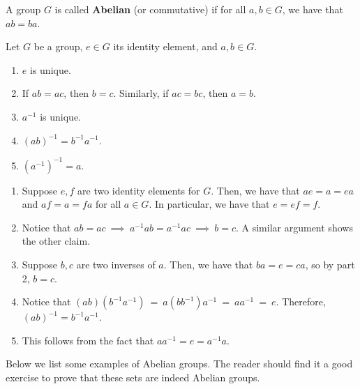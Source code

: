 \documentclass{article}
\begin{document}
\begin{defn}[]
A group $ G $ is called \textbf{Abelian} (or commutative) if for all $ a, b \in G $, we have that $ ab = ba $.
\end{defn}

\newpage
\begin{thm}[title=Basic Properties]
Let $ G $ be a group, $ e \in G $ its identity element, and $ a, b \in G $.
\begin{enumerate}[]
    \item $ e $ is unique.
    \item If $ ab = ac $, then $ b = c $. Similarly, if $ ac = bc $, then $ a = b $.
    \item $ a^{-1} $ is unique.
    \item $ (ab)^{-1} = b^{-1}a^{-1} $.
    \item $ (a^{-1})^{-1} = a $.
\end{enumerate}
\end{thm}

\begin{pf}[source=Primary Source Material]
    \begin{enumerate}[]
        \item Suppose $ e, f $ are two identity elements for $ G $. Then, we have that $ ae = a = ea $ and $ af = a = fa $ for all $ a \in G $. In particular, we have that $ e = ef = f $.
        \item Notice that $ ab = ac \ \implies \ a^{-1}ab = a^{-1}ac \ \implies \ b = c $. A similar argument shows the other claim.
        \item Suppose $ b, c $ are two inverses of $ a $. Then, we have that $ ba = e = ca $, so by part 2, $ b = c $.
        \item Notice that $ (ab)(b^{-1}a^{-1}) \ = \ a(bb^{-1})a^{-1} \ = \ aa^{-1} \ = \ e $. Therefore, $ (ab)^{-1} = b^{-1}a^{-1} $.
        \item This follows from the fact that $ aa^{-1} = e = a^{-1}a $.
    \end{enumerate}
\end{pf}

Below we list some examples of Abelian groups. The reader should find it a good exercise to prove that these sets are indeed Abelian groups.
\end{document}
